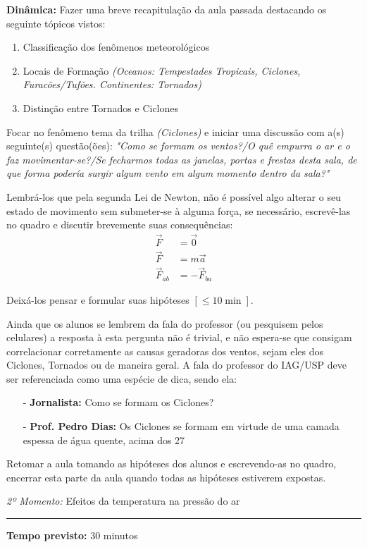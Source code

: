 \documentclass[
12pt,				%
openright,			%
oneside,			%
a4paper,			%
chapter=TITLE,		%
english,			%
brazil				%
]{abntex2}
\begin{document}
\noindent\textbf{Dinâmica:}  Fazer uma breve recapitulação da aula passada destacando os seguinte tópicos vistos:
\begin{enumerate}[label=\alph *)]
		\item Classificação dos fenômenos meteorológicos
		\item Locais de Formação \textit{(Oceanos: Tempestades Tropicais, Ciclones, Furacões/Tufões. Continentes: Tornados)}
		\item Distinção entre Tornados e Ciclones
\end{enumerate}

Focar no fenômeno tema da trilha \textit{(Ciclones)} e iniciar uma discussão com a(s) seguinte(s) questão(ões): \textit{"Como se formam os ventos?/O quê empurra o ar e o faz movimentar-se?/Se fecharmos todas as janelas, portas e frestas desta sala, de que forma podería surgir algum vento em algum momento dentro da sala?"}

Lembrá-los que pela segunda Lei de Newton, não é possível algo alterar o seu estado de movimento sem submeter-se à alguma força, se necessário, escrevê-las no quadro e discutir brevemente suas consequências: 
\begin{align}
	\vec{F} &= \vec{0}\\
	\vec{F} &= m \vec{a}\\
	\vec{F}_{ab} &= -\vec{F}_{ba}
\end{align}

Deixá-los pensar e formular suas hipóteses $[\leq 10\min]$.

Ainda que os alunos se lembrem da fala do professor (ou pesquisem pelos celulares) a resposta à esta pergunta não é trivial, e não espera-se que consigam correlacionar corretamente as causas geradoras dos ventos, sejam eles dos Ciclones, Tornados ou de maneira geral. A fala do professor do IAG/USP deve ser referenciada como uma espécie de dica, sendo ela: 
\begin{itemize}
	\item[-] \textbf{Jornalista:} Como se formam os Ciclones?
	\item[-] \textbf{Prof. Pedro Dias:} Os Ciclones se formam em virtude de uma camada espessa de água quente, acima dos 27\Celsius [...]
\end{itemize}
Retomar a aula tomando as hipóteses dos alunos e escrevendo-as no quadro, encerrar esta parte da aula quando todas as hipóteses estiverem expostas.


\vspace{50pt}
\noindent\emph{2º Momento:} Efeitos da temperatura na pressão do ar 
\par\noindent\rule{.3\textwidth}{.5pt}    
\par\noindent\textbf{Tempo previsto:} 30 minutos
\end{document}
